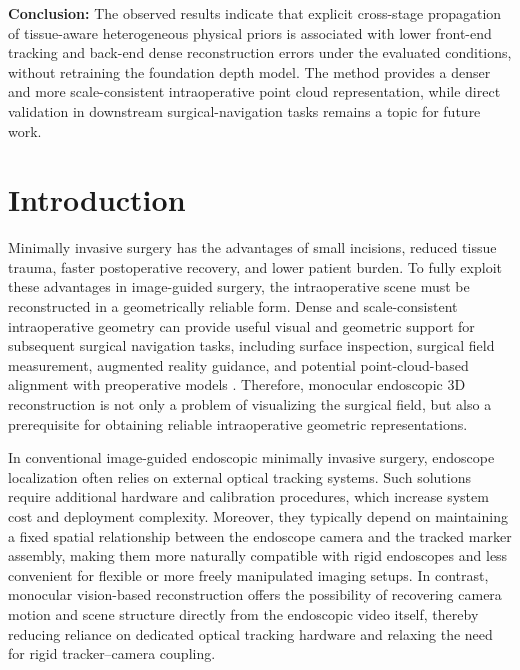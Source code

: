 \documentclass[pdflatex,sn-mathphys-num]{sn-jnl}
\begin{document}
{\textbf{Conclusion:} The observed results indicate that explicit cross-stage propagation of tissue-aware heterogeneous physical priors is associated with lower front-end tracking and back-end dense reconstruction errors under the evaluated conditions, without retraining the foundation depth model. The method provides a denser and more scale-consistent intraoperative point cloud representation, while direct validation in downstream surgical-navigation tasks remains a topic for future work.}


\maketitle

\section{Introduction}\label{sec:introduction}

Minimally invasive surgery has the advantages of small incisions, reduced tissue trauma, faster postoperative recovery, and lower patient burden. To fully exploit these advantages in image-guided surgery, the intraoperative scene must be reconstructed in a geometrically reliable form. Dense and scale-consistent intraoperative geometry can provide useful visual and geometric support for subsequent surgical navigation tasks, including surface inspection, surgical field measurement, augmented reality guidance, and potential point-cloud-based alignment with preoperative models \cite{bib1,bib2}. Therefore, monocular endoscopic 3D reconstruction is not only a problem of visualizing the surgical field, but also a prerequisite for obtaining reliable intraoperative geometric representations.

In conventional image-guided endoscopic minimally invasive surgery, endoscope localization often relies on external optical tracking systems. Such solutions require additional hardware and calibration procedures, which increase system cost and deployment complexity. Moreover, they typically depend on maintaining a fixed spatial relationship between the endoscope camera and the tracked marker assembly, making them more naturally compatible with rigid endoscopes and less convenient for flexible or more freely manipulated imaging setups. In contrast, monocular vision-based reconstruction offers the possibility of recovering camera motion and scene structure directly from the endoscopic video itself, thereby reducing reliance on dedicated optical tracking hardware and relaxing the need for rigid tracker--camera coupling.
\end{document}
